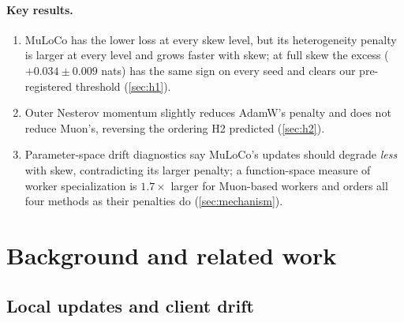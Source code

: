 \documentclass{article}
\begin{document}
\paragraph{Key results.}
\begin{enumerate}
  \item MuLoCo has the lower loss at every skew level, but its heterogeneity penalty is larger at every level and grows faster with skew; at full skew the excess ($+0.034 \pm 0.009$ nats) has the same sign on every seed and clears our pre-registered threshold (\cref{sec:h1}).
  \item Outer Nesterov momentum slightly reduces AdamW's penalty and does not reduce Muon's, reversing the ordering H2 predicted (\cref{sec:h2}).
  \item Parameter-space drift diagnostics say MuLoCo's updates should degrade \emph{less} with skew, contradicting its larger penalty; a function-space measure of worker specialization is $1.7\times$ larger for Muon-based workers and orders all four methods as their penalties do (\cref{sec:mechanism}).
\end{enumerate}

\section{Background and related work}\label{sec:related}

\subsection{Local updates and client drift}
\end{document}
